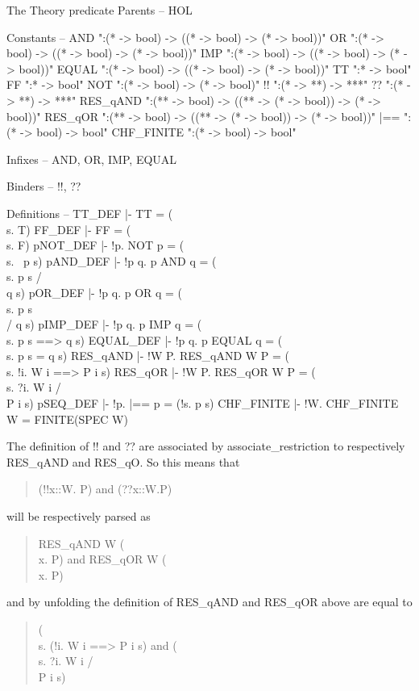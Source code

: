 The Theory predicate
Parents --  HOL     

Constants --
  AND        ":(* -> bool) -> ((* -> bool) -> (* -> bool))"
  OR         ":(* -> bool) -> ((* -> bool) -> (* -> bool))"
  IMP        ":(* -> bool) -> ((* -> bool) -> (* -> bool))"
  EQUAL      ":(* -> bool) -> ((* -> bool) -> (* -> bool))"
  TT         ":* -> bool"     
  FF         ":* -> bool"
  NOT        ":(* -> bool) -> (* -> bool)"     
  !!         ":(* -> **) -> ***"
  ??         ":(* -> **) -> ***"
  RES_qAND   ":(** -> bool) -> ((** -> (* -> bool)) -> (* -> bool))"
  RES_qOR    ":(** -> bool) -> ((** -> (* -> bool)) -> (* -> bool))"
  |==        ":(* -> bool) -> bool"     
  CHF_FINITE ":(* -> bool) -> bool"     

Infixes -- AND, OR, IMP, EQUAL

Binders -- !!, ??

Definitions --
  TT_DEF     |- TT = (\\s. T)
  FF_DEF     |- FF = (\\s. F)
  pNOT_DEF   |- !p. NOT p = (\\s. ~p s)
  pAND_DEF   |- !p q. p AND q = (\\s. p s /\\ q s)
  pOR_DEF    |- !p q. p OR q = (\\s. p s \\/ q s)
  pIMP_DEF   |- !p q. p IMP q = (\\s. p s ==> q s)
  EQUAL_DEF  |- !p q. p EQUAL q = (\\s. p s = q s)
  RES_qAND   |- !W P. RES_qAND W P = (\\s. !i. W i ==> P i s)
  RES_qOR    |- !W P. RES_qOR W P = (\\s. ?i. W i /\\ P i s)
  pSEQ_DEF   |- !p. |== p = (!s. p s)
  CHF_FINITE |- !W. CHF_FINITE W = FINITE(SPEC W)     

\endcode
{}


The definition of \code{}!!\edoc{} and \code{}??\edoc{} are associated by
\code{}associate_restriction\edoc{} to respectively \code{}RES_qAND\edoc{} and \code{}RES_qO\edoc{}.
So this means that 
\begin{quote}
   \code{}(!!x::W. P)\edoc{} and \code{}(??x::W.P)\edoc{}
\end{quote}
will be respectively parsed as
\begin{quote}
   \code{}RES_qAND W (\\x. P)\edoc{} and \code{}RES_qOR W (\\x. P)\edoc{}
\end{quote}
and by unfolding the definition of \code{}RES_qAND\edoc{} and \code{}RES_qOR\edoc{} above are equal to
\begin{quote}
   \code{}(\\s. (!i. W i ==> P i s)\edoc{} and \code{}(\\s. ?i. W i /\\ P i s)\edoc{}
\end{quote}

